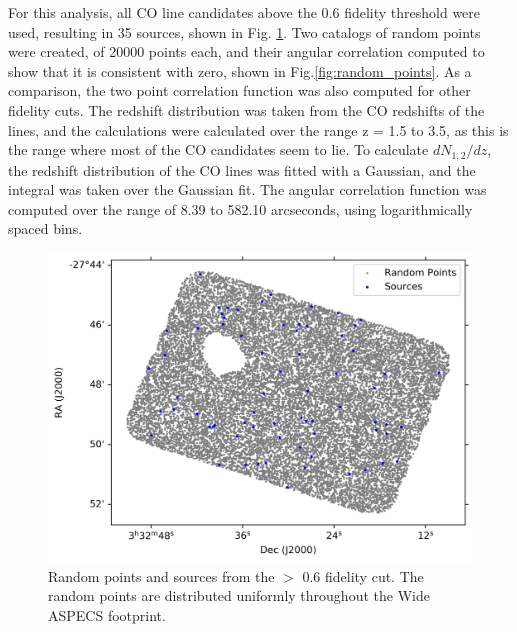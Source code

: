 For this analysis, all CO line candidates above the 0.6 fidelity threshold were used, resulting in 35 sources, shown in Fig. \ref{fig:Clustering_points}. Two catalogs of random points were created, of 20000 points each, and their angular correlation computed to show that it is consistent with zero, shown in Fig.\ref{fig:random_points}. As a comparison, the two point correlation function was also computed for other fidelity cuts. The redshift distribution was taken from the CO redshifts of the lines, and the calculations were calculated over the range z = 1.5 to 3.5, as this is the range where most of the CO candidates seem to lie. To calculate $dN_{1,2}/dz$, the redshift distribution of the CO lines was fitted with a Gaussian, and the integral was taken over the Gaussian fit. The angular correlation function was computed over the range of 8.39 to 582.10 arcseconds, using logarithmically spaced bins. 


\begin{figure}[tbp]
\centering \includegraphics[width=120mm]{PDFS/NX_V_Y_Sources_20000.png}
\caption{Random points and sources from the $>$ 0.6 fidelity cut. The random points are distributed uniformly throughout the Wide ASPECS footprint.}
\label{fig:Clustering_points}
\end{figure}

